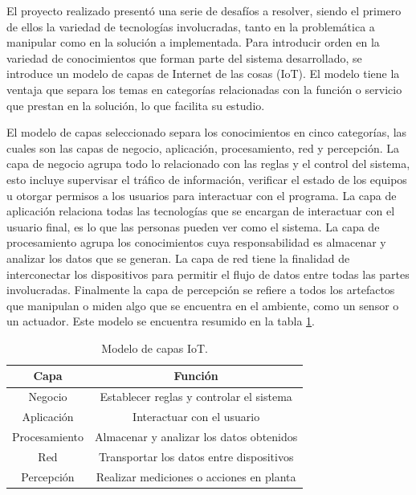 El proyecto realizado presentó una serie de desafíos a resolver, siendo el primero de ellos la variedad de tecnologías involucradas, tanto en la problemática a manipular como en la solución a implementada.
Para introducir orden en la variedad de conocimientos que forman parte del sistema desarrollado, se introduce un modelo de capas de Internet de las cosas (IoT). El modelo tiene la ventaja que separa los temas en categorías relacionadas con la función o servicio que prestan en la solución, lo que facilita su estudio. 

El modelo de capas seleccionado separa los conocimientos en cinco categorías, las cuales son las capas de negocio, aplicación, procesamiento, red y percepción.
La capa de negocio agrupa todo lo relacionado con las reglas y el control del sistema, esto incluye supervisar el tráfico de información, verificar el estado de los equipos u otorgar permisos a los usuarios para interactuar con el programa.
La capa de aplicación relaciona todas las tecnologías que se encargan de interactuar con el usuario final, es lo que las personas pueden ver como el sistema.
La capa de procesamiento agrupa los conocimientos cuya responsabilidad es almacenar y analizar los datos que se generan.
La capa de red tiene la finalidad de interconectar los dispositivos para permitir el flujo de datos entre todas las partes involucradas.
Finalmente la capa de percepción se refiere a todos los artefactos que manipulan o miden algo que se encuentra en el ambiente, como un sensor o un actuador. Este modelo se encuentra resumido en la tabla \ref{tab:modeloCapas}.

\begin{table}[h]
	\centering
	\caption{\label{tab:modeloCapas}Modelo de capas IoT.}
	\begin{tabular}{c c}
		\toprule
		\textbf{Capa} & \textbf{Función}                         \\
		\midrule
		Negocio       & Establecer reglas y controlar el sistema \\
		Aplicación    & Interactuar con el usuario               \\
		Procesamiento & Almacenar y analizar los datos obtenidos \\
		Red           & Transportar los datos entre dispositivos \\
		Percepción    & Realizar mediciones o acciones en planta \\
		\bottomrule
		\hline
	\end{tabular}
\end{table}

